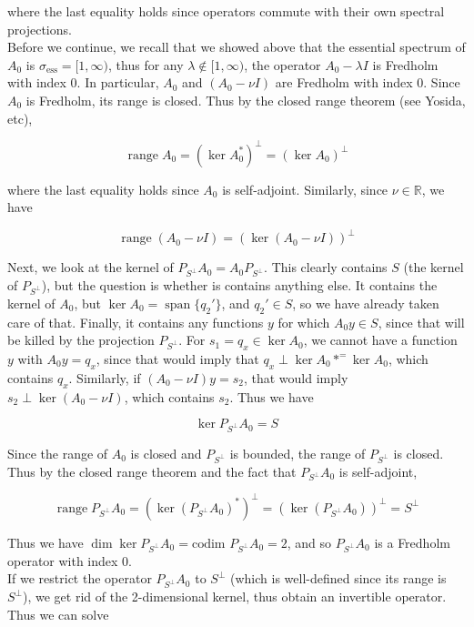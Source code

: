 \documentclass[12pt]{article}
\def\R{{\mathbb R}}
\DeclareMathOperator{\spn}{span}
\DeclareMathOperator{\ran}{range}
\begin{document}
\begin{enumerate}
where the last equality holds since operators commute with their own spectral projections.\\

Before we continue, we recall that we showed above that the essential spectrum of $A_0$ is $\sigma_{\text{ess}} = [1, \infty)$, thus for any $\lambda \notin [1, \infty)$, the operator $A_0 - \lambda I$ is Fredholm with index 0. In particular, $A_0$ and $(A_0 - \nu I)$ are Fredholm with index 0. Since $A_0$ is Fredholm, its range is closed. Thus by the closed range theorem (see Yosida, etc), 

\[
\ran A_0 = (\ker A_0^*)^\perp = (\ker A_0)^\perp
\]

where the last equality holds since $A_0$ is self-adjoint. Similarly, since $\nu \in \R$, we have

\[
\ran (A_0 - \nu I) = (\ker (A_0 - \nu I))^\perp 
\]

Next, we look at the kernel of $P_{S^\perp} A_0 = A_0 P_{S^\perp}$. This clearly contains $S$ (the kernel of $P_{S^\perp}$), but the question is whether is contains anything else. It contains the kernel of $A_0$, but $\ker A_0 = \spn\{ q_2' \}$, and $q_2' \in S$, so we have already taken care of that. Finally, it contains any functions $y$ for which $A_0 y \in S$, since that will be killed by the projection $P_{S^\perp}$. For $s_1 = q_x \in \ker A_0$, we cannot have a function $y$ with $A_0 y = q_x$, since that would imply that $q_x \perp \ker A_0*^ = \ker A_0$, which contains $q_x$. Similarly, if $(A_0 - \nu I)y = s_2$, that would imply $s_2 \perp \ker (A_0 - \nu I)$, which contains $s_2$. Thus we have

\[
\ker P_{S^\perp} A_0 = S 
\]

Since the range of $A_0$ is closed and $P_{S^\perp}$ is bounded, the range of $P_{S^\perp}$ is closed. Thus by the closed range theorem and the fact that $P_{S^\perp} A_0$ is self-adjoint,

\[
\ran P_{S^\perp} A_0 = (\ker (P_{S^\perp} A_0)^*)^\perp = (\ker (P_{S^\perp} A_0))^\perp = S^\perp
\]

Thus we have $\dim \ker P_{S^\perp} A_0 = \text{codim } P_{S^\perp} A_0 = 2$, and so $P_{S^\perp} A_0$ is a Fredholm operator with index 0.\\

If we restrict the operator $P_{S^\perp} A_0$ to $S^\perp$ (which is well-defined since its range is $S^\perp$), we get rid of the 2-dimensional kernel, thus obtain an invertible operator. Thus we can solve


\end{enumerate}
\end{document}
